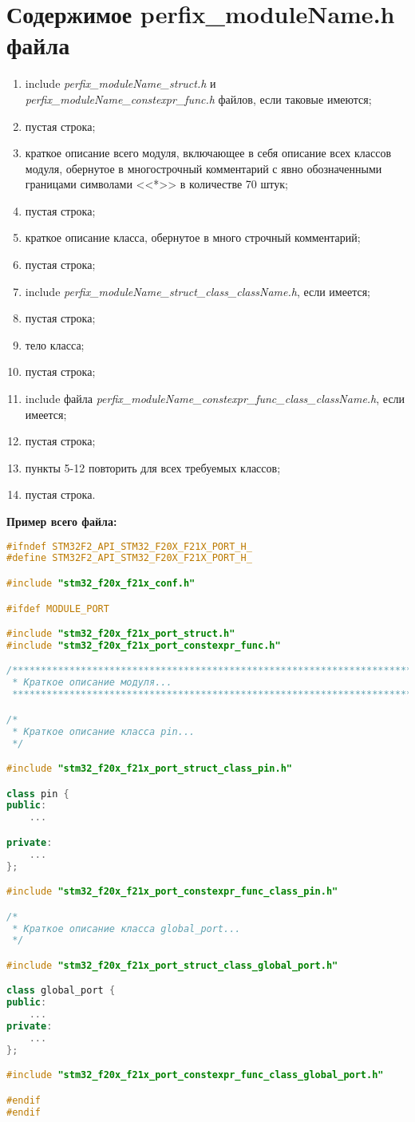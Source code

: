 \section{Содержимое perfix\_moduleName.h файла}\label{p:modul:h}
\begin{enumerate}
	\item include \textit{perfix\_moduleName\_struct.h} и \textit{perfix\_moduleName\_constexpr\_func.h}  файлов, если таковые имеются;
	\item пустая строка;
	\item краткое описание всего модуля, включающее в себя описание всех классов модуля, обернутое в многострочный комментарий с явно обозначенными границами символами <<*>> в количестве 70 штук;
	\item пустая строка;
	\item краткое описание класса, обернутое в много строчный комментарий;
	\item пустая строка;
	\item include \textit{perfix\_moduleName\_struct\_class\_className.h}, если имеется;
	\item пустая строка;
	\item тело класса;
	\item пустая строка;
	\item include файла \textit{perfix\-\_moduleName\-\_constexpr\-\_func\-\_class\-\_className.h}, если имеется;
	\item пустая строка;
	\item пункты 5-12 повторить для всех требуемых классов;
	\item пустая строка.
\end{enumerate}
\textbf{Пример всего файла:}\begin{lstlisting}[language=C++, frame=tlBR, basicstyle=\fontsize{10}{10}\ttfamily]
#ifndef STM32F2_API_STM32_F20X_F21X_PORT_H_
#define STM32F2_API_STM32_F20X_F21X_PORT_H_

#include "stm32_f20x_f21x_conf.h"

#ifdef MODULE_PORT

#include "stm32_f20x_f21x_port_struct.h"						
#include "stm32_f20x_f21x_port_constexpr_func.h"				

/**********************************************************************
 * Краткое описание модуля...
 **********************************************************************/

/*
 * Краткое описание класса pin...
 */

#include "stm32_f20x_f21x_port_struct_class_pin.h"

class pin {
public:
	...

private:
	...
};

#include "stm32_f20x_f21x_port_constexpr_func_class_pin.h"

/*
 * Краткое описание класса global_port...
 */

#include "stm32_f20x_f21x_port_struct_class_global_port.h"		

class global_port {
public:
	...
private:
	...
};

#include "stm32_f20x_f21x_port_constexpr_func_class_global_port.h"

#endif
#endif
 \end{lstlisting}

